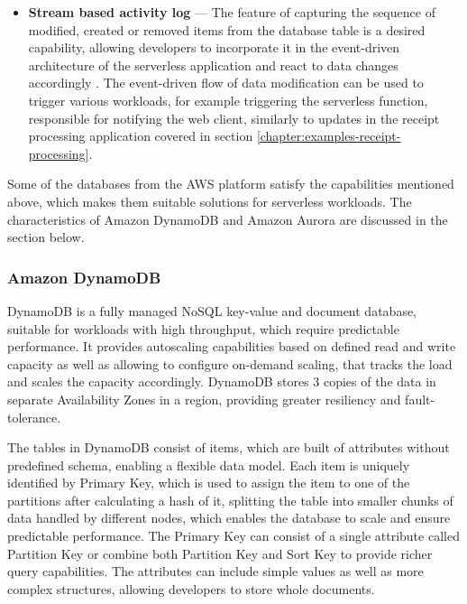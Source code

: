 \begin{itemize}
   \item \textbf{Stream based activity log} ---
   The feature of capturing the sequence of modified, created or removed items from the database table is a desired capability, allowing developers to incorporate it in the event-driven architecture of the serverless application and react to data changes accordingly \cite{FauxSQLOrNoSQLExaminingFourDynamoDBPatternsInServerlessApplications}.
   The event-driven flow of data modification can be used to trigger various workloads, for example triggering the serverless function, responsible for notifying the web client, similarly to updates in the receipt processing application covered in section \ref{chapter:examples-receipt-processing}.
\end{itemize}

Some of the databases from the AWS platform satisfy the capabilities mentioned above, which makes them suitable solutions for serverless workloads.
The characteristics of Amazon DynamoDB and Amazon Aurora are discussed in the section below.

\subsubsection{Amazon DynamoDB}

DynamoDB \cite{DynamoDB} is a fully managed NoSQL key-value and document database, suitable for workloads with high throughput, which require predictable performance.
It provides autoscaling capabilities based on defined read and write capacity as well as allowing to configure on-demand scaling, that tracks the load and scales the capacity accordingly.
DynamoDB stores 3 copies of the data in separate Availability Zones in a region, providing greater resiliency and fault-tolerance.

The tables in DynamoDB consist of items, which are built of attributes without predefined schema, enabling a flexible data model.
Each item is uniquely identified by Primary Key, which is used to assign the item to one of the partitions after calculating a hash of it, splitting the table into smaller chunks of data handled by different nodes, which enables the database to scale and ensure predictable performance.
The Primary Key can consist of a single attribute called Partition Key or combine both Partition Key and Sort Key to provide richer query capabilities.
The attributes can include simple values as well as more complex structures, allowing developers to store whole documents.

